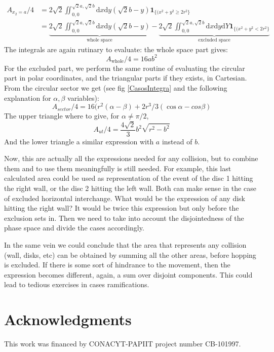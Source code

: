\documentclass[letterpaper,10pt, jcp, aps]{revtex4-1}
\newcommand{\rd}{\!\mathrm{d}}
\newcommand{\indicator}[1]{\mathbf{1}_{ \{   #1 \} } }
\begin{document}
    \begin{align}
      A_{x_2=a}/4 & =2\sqrt{2}\iint_{0,0}^{\sqrt{2}a,\sqrt{2}b}
        \rd x \rd y (\sqrt{2} b - y)
        \indicator{(x^2+y^2 \geq 2 r^2}\\
     &=\underbrace{2\sqrt{2}\iint_{0,0}^{\sqrt{2}a,\sqrt{2}b}
        \rd x \rd y (\sqrt{2} b - y)}_{\text{whole space}}
      -\underbrace{2\sqrt{2}\iint_{0,0}^{\sqrt{2}a,\sqrt{2}b}
        \rd x \rd y \rd Y 
        \indicator{(x^2+y^2 < 2 r^2}}_{\text{excluded space}}
       \end{align}
    The integrals are again rutinary to evaluate: the whole space part
    gives:
    \begin{equation}
      A_{\text{whole}}/4=16ab^2
    \end{equation}
    For the excluded part, we perform the same routine of evaluating the circular part
    in polar coordinates, and the triangular parts if they exists, in Cartesian.
    From the circular sector we get (see fig \ref{CasosIntegra} and the following explanation
    for $\alpha, \beta$ variables):
    \begin{equation}
      A_{sector}/4=16(r^2(\alpha-\beta)+2r^3/3(\cos\alpha-cos\beta)
    \end{equation}
    The upper triangle where to give, for $\alpha \neq \pi/2$,
    \begin{equation}
    A_{ut}/4=\frac{4\sqrt{2}}{3}b^2\sqrt{r^2-b^2}
    \end{equation}
    And the lower triangle a similar expression with $a$ instead of $b$.

    Now, this are actually all the expressions needed for any collision, but
    to combine them and to use them meaningfully is still needed. For example,
    this last calculated area could be used as representation of the event of
    the disc 1 hitting the right wall, or the disc 2 hitting the left wall. Both
    can make sense in the case of excluded horizontal interchange. What would be
    the expression of any disk hitting the right wall? It would be twice this expression
    but only before the exclusion sets in. Then we need to take into account
    the disjointedness of the phase space and divide the cases accordingly.

    In the same vein we could conclude that the area that represents
    any collision (wall, disks, etc) can be obtained by summing all the other
    areas, before hopping is excluded. If there is some sort of hindrance to
    the movement, then the expression becomes different, again, a sum over
    disjoint components. This could lead to tedious exercises in cases ramifications.

    
    
    

    

    
\section{Acknowledgments}


This work was financed by CONACYT-PAPIIT project number CB-101997.






\end{document}
